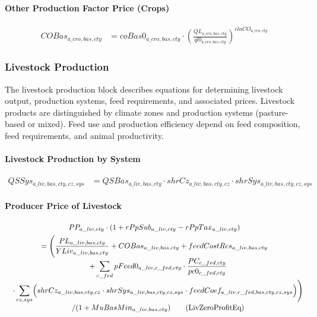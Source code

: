 \paragraph{Other Production Factor Price (Crops)}
\begin{align}
  COBas_{a\_cro,bas,cty}
  &= coBas0_{a\_cro,bas,cty}
     \cdot
     \left(
       \frac{QL_{a\_cro,bas,cty}}
            {ql0_{a\_cro,bas,cty}}
     \right)^{elaCO_{a\_cro,cty}}
  \tag{COCroEq}\label{eq:COCroEq}
\end{align}


\subsubsection{Livestock Production}

The livestock production block describes equations for determining livestock output, production systems, feed requirements, and associated prices.  
Livestock products are distinguished by climate zones and production systems (pasture-based or mixed).  
Feed use and production efficiency depend on feed composition, feed requirements, and animal productivity.

\paragraph{Livestock Production by System}
\begin{align}
  QSSys_{a\_liv,bas,cty,cz,sys}
  &= QSBas_{a\_liv,bas,cty}
     \cdot shrCz_{a\_liv,bas,cty,cz}
     \cdot shrSys_{a\_liv,bas,cty,cz,sys}
  \tag{QSSysEq}\label{eq:QSSysEq}
\end{align}

\paragraph{Producer Price of Livestock}
\begin{multline}
  PP_{a\_liv,cty}\cdot(1+rPpSub_{a\_liv,cty}-rPpTax_{a\_liv,cty}) \\
  = \Biggl(\frac{PL_{a\_liv,bas,cty}}{YLiv_{a\_liv,bas,cty}}
       + COBas_{a\_liv,bas,cty}
       + feedCostRes_{a\_liv,bas,cty}
       \\[-0.3em]
  \quad + \sum_{c\_fed}pFeed0_{a\_liv,c\_fed,cty}
       \cdot\frac{PC_{c\_fed,cty}}{pc0_{c\_fed,cty}}
       \\[-0.3em]
  \quad \cdot \sum_{cz,sys}\Bigl(
       shrCz_{a\_liv,bas,cty,cz}\cdot
       shrSys_{a\_liv,bas,cty,cz,sys}\cdot
       feedCoef_{a\_liv,c\_fed,bas,cty,cz,sys}\Bigr)\Biggr)
       \\[-0.3em]
  \quad / (1+MuBasMin_{a\_liv,bas,cty})
  \tag{LivZeroProfitEq}\label{eq:LivZeroProfitEq}
\end{multline}

